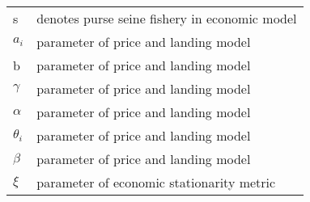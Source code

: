 \documentclass[]{article}
\begin{document}
\begin{longtable}[]{@{}ll@{}}
\begin{minipage}[t]{0.13\columnwidth}\raggedright\strut
s\strut
\end{minipage} & \begin{minipage}[t]{0.76\columnwidth}\raggedright\strut
denotes purse seine fishery in economic model\strut
\end{minipage}\tabularnewline
\begin{minipage}[t]{0.13\columnwidth}\raggedright\strut
\(a_i\)\strut
\end{minipage} & \begin{minipage}[t]{0.76\columnwidth}\raggedright\strut
parameter of price and landing model\strut
\end{minipage}\tabularnewline
\begin{minipage}[t]{0.13\columnwidth}\raggedright\strut
b\strut
\end{minipage} & \begin{minipage}[t]{0.76\columnwidth}\raggedright\strut
parameter of price and landing model\strut
\end{minipage}\tabularnewline
\begin{minipage}[t]{0.13\columnwidth}\raggedright\strut
\(\gamma\)\strut
\end{minipage} & \begin{minipage}[t]{0.76\columnwidth}\raggedright\strut
parameter of price and landing model\strut
\end{minipage}\tabularnewline
\begin{minipage}[t]{0.13\columnwidth}\raggedright\strut
\(\alpha\)\strut
\end{minipage} & \begin{minipage}[t]{0.76\columnwidth}\raggedright\strut
parameter of price and landing model\strut
\end{minipage}\tabularnewline
\begin{minipage}[t]{0.13\columnwidth}\raggedright\strut
\(\theta_i\)\strut
\end{minipage} & \begin{minipage}[t]{0.76\columnwidth}\raggedright\strut
parameter of price and landing model\strut
\end{minipage}\tabularnewline
\begin{minipage}[t]{0.13\columnwidth}\raggedright\strut
\(\beta\)\strut
\end{minipage} & \begin{minipage}[t]{0.76\columnwidth}\raggedright\strut
parameter of price and landing model\strut
\end{minipage}\tabularnewline
\begin{minipage}[t]{0.13\columnwidth}\raggedright\strut
\(\xi\)\strut
\end{minipage} & \begin{minipage}[t]{0.76\columnwidth}\raggedright\strut
parameter of economic stationarity metric\strut
\end{minipage}\tabularnewline
\bottomrule
\end{longtable}
\end{document}
